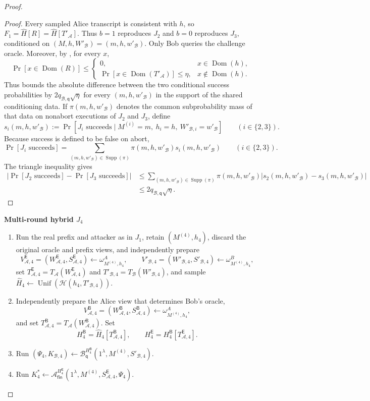 \documentclass[11pt]{article}
\newcommand{\cA}{\mathcal{A}}
\newcommand{\cB}{\mathcal{B}}
\newcommand{\cH}{\mathcal{H}}
\newcommand{\Dom}{\operatorname{Dom}}
\newcommand{\Unif}{\operatorname{Unif}}
\newcommand{\Supp}{\operatorname{Supp}}
\newcommand{\changed}[1]{\textcolor{purple!75!black}{#1}}
\newcommand{\mrchanged}[1]{\changed{#1}}
\newenvironment{hybrid}[1]{%
  \par\medskip
  \noindent\textbf{#1}
  \begin{enumerate}[leftmargin=2.5em,label=\arabic*.,itemsep=0.25em,topsep=0.35em]
}{%
  \end{enumerate}
  \medskip
}
\begin{document}
\begin{proof}
\begin{proof}
Every sampled Alice transcript is consistent with \(h\), so
\(F_1=\widehat H[R]=\widehat H[T'_{\cA}]\). Thus \(b=1\) reproduces \(J_2\)
and \(b=0\) reproduces \(J_3\), conditioned on
\((M,h,W'_{\cB})=(m,h,w'_{\cB})\). Only Bob queries the challenge oracle.
Moreover, by
, for every \(x\),
\[
  \Pr[x\in\Dom(R)]
  \le
  \begin{cases}
    0,&x\in\Dom(h),\\
    \Pr[x\in\Dom(T'_{\cA})]\le\eta,&x\notin\Dom(h).
  \end{cases}
\]
Thus  bounds the absolute difference between the two
conditional success probabilities by \(2q_{\cB,\mathsf q}\sqrt\eta\) for
every \((m,h,w'_{\cB})\) in the support of the shared conditioning data. If
\(\pi(m,h,w'_{\cB})\) denotes the common subprobability mass of that data on
nonabort executions of \(J_2\) and \(J_3\), define
\[
  s_i(m,h,w'_{\cB})
  :=
  \Pr[J_i\text{ succeeds}\mid
    M^{(i)}=m,\ h_i=h,\ W'_{\cB,i}=w'_{\cB}]
  \qquad (i\in\{2,3\}).
\]
Because success is defined to be false on abort,
\[
  \Pr[J_i\text{ succeeds}]
  =
  \sum_{(m,h,w'_{\cB})\in\Supp(\pi)}
    \pi(m,h,w'_{\cB})s_i(m,h,w'_{\cB})
  \qquad (i\in\{2,3\}).
\]
The triangle inequality gives
\[
  \begin{aligned}
  \left|\Pr[J_2\text{ succeeds}]-\Pr[J_3\text{ succeeds}]\right|
  &\le
  \sum_{(m,h,w'_{\cB})\in\Supp(\pi)}\pi(m,h,w'_{\cB})
  \left|s_2(m,h,w'_{\cB})-s_3(m,h,w'_{\cB})\right|\\
  &\le 2q_{\cB,\mathsf q}\sqrt\eta.
  \end{aligned}
\]
\end{proof}

\begin{hybrid}{Multi-round hybrid \(J_4\)}
  \item Run the real prefix and attacker as in \(J_1\), retain
  \((M^{(4)},h_4)\), discard the original oracle and prefix views, and
  independently prepare
  \[
    V^{\mathsf E}_{\cA,4}
      =(W^{\mathsf E}_{\cA,4},S^{\mathsf E}_{\cA,4})
      \leftarrow\omega^A_{M^{(4)},h_4},
    \qquad
    V'_{\cB,4}=(W'_{\cB,4},S'_{\cB,4})
      \leftarrow\omega^B_{M^{(4)},h_4},
  \]
  set \(T^{\mathsf E}_{\cA,4}=T_{\cA}(W^{\mathsf E}_{\cA,4})\) and
  \(T'_{\cB,4}=T_{\cB}(W'_{\cB,4})\), and sample
  \(\widehat H_4\leftarrow\Unif(\cH(h_4,T'_{\cB,4}))\).
  \item \mrchanged{Independently prepare the Alice view that determines
  Bob's oracle,
  \[
    V^{\mathsf B}_{\cA,4}
    =
    (W^{\mathsf B}_{\cA,4},S^{\mathsf B}_{\cA,4})
    \leftarrow\omega^A_{M^{(4)},h_4},
  \]
  and set
  \(T^{\mathsf B}_{\cA,4}=T_{\cA}(W^{\mathsf B}_{\cA,4})\).
  Set
  \[
    H^{\mathsf B}_4=\widehat H_4[T^{\mathsf B}_{\cA,4}],
    \qquad
    H^{\mathsf E}_4=H^{\mathsf B}_4[T^{\mathsf E}_{\cA,4}].
  \]}
  \item Run
  \((\Psi_4,K_{\cB,4})\leftarrow
    \cB_{\mathsf q}^{H^{\mathsf B}_4}
    (1^\lambda,M^{(4)},S'_{\cB,4})\).
  \item Run
  \(K^*_4\leftarrow
    \cA_{\mathsf{fin}}^{H^{\mathsf E}_4}
    (1^\lambda,M^{(4)},S^{\mathsf E}_{\cA,4},\Psi_4)\).
\end{hybrid}


\end{proof}
\end{document}
